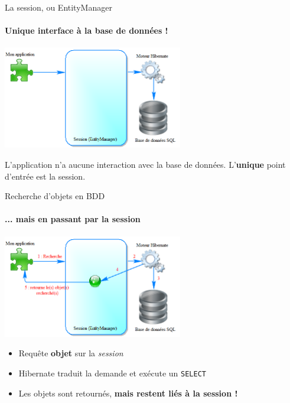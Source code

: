 \documentclass[compact]{beamer}%
\begin{document}
\begin{frame}{La session, ou EntityManager}
	\framesubtitle{Unique interface à la base de données !}
	
	\begin{center}
	\includegraphics[height=4.5cm]{images/with_orm_empty.png}	
	\end{center}
	
	\begin{block}{}
	\center
	L'application n'a aucune interaction avec la base de données. L'\textbf{unique} point d'entrée est la session.
	\end{block}
\end{frame}

\begin{frame}{Recherche d'objets en BDD}
	\framesubtitle{... mais en passant par la session}
	
	\begin{center}
	\includegraphics[height=4.5cm]{images/with_orm_select.png}	
	\end{center}
	
	\begin{itemize}
	\item Requête \textbf{objet} sur la \emph{session}
	\item Hibernate traduit la demande et exécute un \texttt{SELECT}
	\item Les objets sont retournés, \textbf{mais restent liés à la session !}
	\end{itemize}
	
\end{frame}
\end{document}
